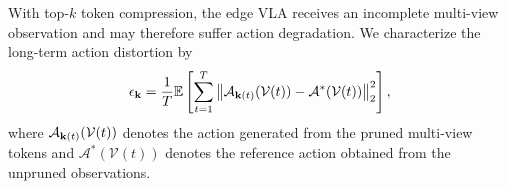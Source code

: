 \documentclass[lettersize,journal]{IEEEtran}
\theoremstyle{custom}
\begin{document}
With top-$k$ token compression, the edge VLA receives an incomplete multi-view observation and may therefore suffer action degradation. We characterize the long-term action distortion by
\begin{align}
    \epsilon_{\bf k}
    = \frac{1}{T}\mathbb{E}\left[
    \sum_{t=1}^{T}
    \left\|\mathcal{A}_{{\bf k}(t)}(\mathcal{V}(t))
    -\mathcal{A}^{*}(\mathcal{V}(t))\right\|_2^2
    \right],
    \label{action_mse}
\end{align}
where $\mathcal{A}_{{\bf k}(t)}(\mathcal{V}(t))$ denotes the action generated from the pruned multi-view tokens and $\mathcal{A}^{*}(\mathcal{V}(t))$ denotes the reference action obtained from the unpruned observations. 



\end{document}
